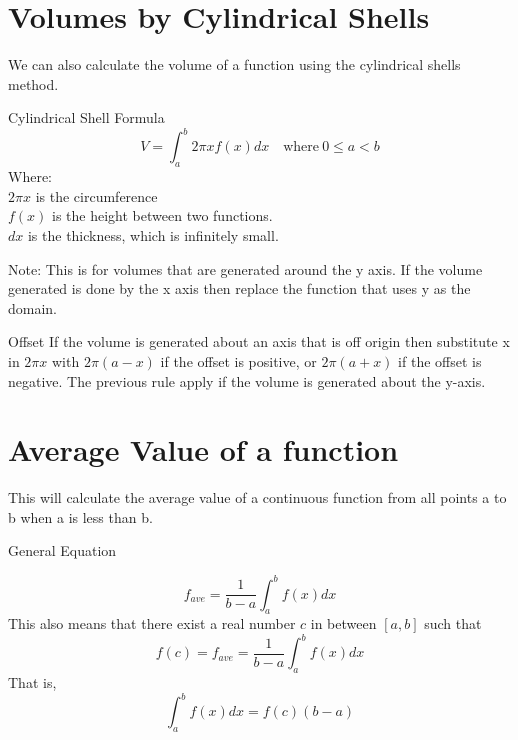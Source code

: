 \documentclass[letterpaper,10pt,twoside,twocolumn,openany]{book}
\begin{document}
\section{Volumes by Cylindrical Shells}
We can also calculate the volume of a function using the cylindrical shells method.
\begin{paperbox}[]{Cylindrical Shell Formula}
    \begin{equation}
        V = \int_a^b 2\pi x f(x) dx \quad \text{where}\ 0 \leq a < b
    \end{equation}
    Where: \\
    $2\pi x$ is the circumference\\
    $f(x)$ is the height between two functions.\\
    $dx$ is the thickness, which is infinitely small.
\end{paperbox}
\begin{commentbox}{}
    Note: This is for volumes that are generated around the y axis. If the volume generated is done by the x axis then replace the function that uses y as the domain.    
\end{commentbox}


\begin{commentbox}{Offset}
    If the volume is generated about an axis that is off origin then substitute x in $2\pi x$ with $2\pi (a - x)$ if the offset is positive, or $2\pi (a + x)$ if the offset is negative. The previous rule apply if the volume is generated about the y-axis. 
\end{commentbox}

\newpage


\section{Average Value of a function}
This will calculate the average value of a continuous function from all points a to b when a is less than b.
\begin{paperbox}[]{General Equation}
    
    \begin{equation}
        f_{ave} = \frac{1}{b-a} \int_a^b f(x)dx 
    \end{equation}
    This also means that there exist a real number $c$ in between $[a,b]$ such that
    \begin{equation}
        f(c) = f_{ave} = \frac{1}{b-a} \int_a^b f(x)dx 
    \end{equation}
    That is, 
    \begin{equation}
        \int_a^b f(x)dx = f(c)(b-a)
    \end{equation}
\end{paperbox}
\end{document}
